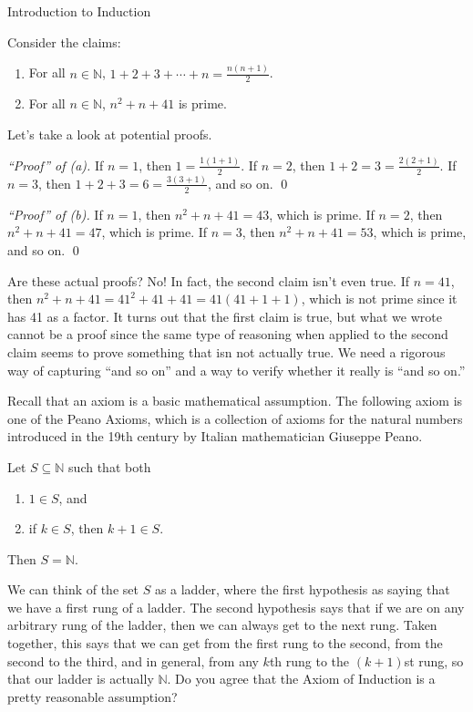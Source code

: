 \begin{section}{Introduction to Induction}

Consider the claims:
\begin{enumerate}[label=\textrm{(\alph*)}]
\item For all $n\in\mathbb{N}$, $\displaystyle 1+2+3+\cdots +n=\frac{n(n+1)}{2}$.
\item For all $n\in\mathbb{N}$, $n^{2}+n+41$ is prime.
\end{enumerate}
Let's take a look at potential proofs.

\bigskip

\noindent \emph{``Proof'' of (a).} If $n=1$, then $1=\frac{1(1+1)}{2}$.  If $n=2$, then $1+2=3=\frac{2(2+1)}{2}$.  If $n=3$, then $1+2+3=6=\frac{3(3+1)}{2}$, and so on. \hfill \qed

\bigskip

\noindent \emph{``Proof'' of (b).} If $n=1$, then $n^{2}+n+41=43$, which is prime.  If $n=2$, then $n^{2}+n+41=47$, which is prime.  If $n=3$, then $n^{2}+n+41=53$, which is prime, and so on. \hfill \qed

\bigskip

Are these actual proofs?  No!  In fact, the second claim isn't even true.  If $n=41$, then $n^{2}+n+41=41^{2}+41+41=41(41+1+1)$, which is not prime since it has 41 as a factor.  It turns out that the first claim is true, but what we wrote cannot be a proof since the same type of reasoning when applied to the second claim seems to prove something that isn not actually true.  We need a rigorous way of capturing ``and so on'' and a way to verify whether it really is ``and so on.''

Recall that an axiom is a basic mathematical assumption.  The following axiom is one of the Peano Axioms, which is a collection of axioms for the natural numbers introduced in the 19th century by Italian mathematician Giuseppe Peano.

\begin{axiom}\label{axiom:induction}
Let $S\subseteq \mathbb{N}$ such that both
\begin{enumerate}[label=\textrm{(\roman*)}]
\item $1\in S$, and
\item if $k\in S$, then $k+1\in S$.
\end{enumerate}
Then $S=\mathbb{N}$.
\end{axiom}

We can think of the set $S$ as a ladder, where the first hypothesis as saying that we have a first rung of a ladder.  The second hypothesis says that if we are on any arbitrary rung of the ladder, then we can always get to the next rung.  Taken together, this says that we can get from the first rung to the second, from the second to the third, and in general, from any $k$th rung to the $(k+1)$st rung, so that our ladder is actually $\mathbb{N}$. Do you agree that the Axiom of Induction is a pretty reasonable assumption?


\end{section}
